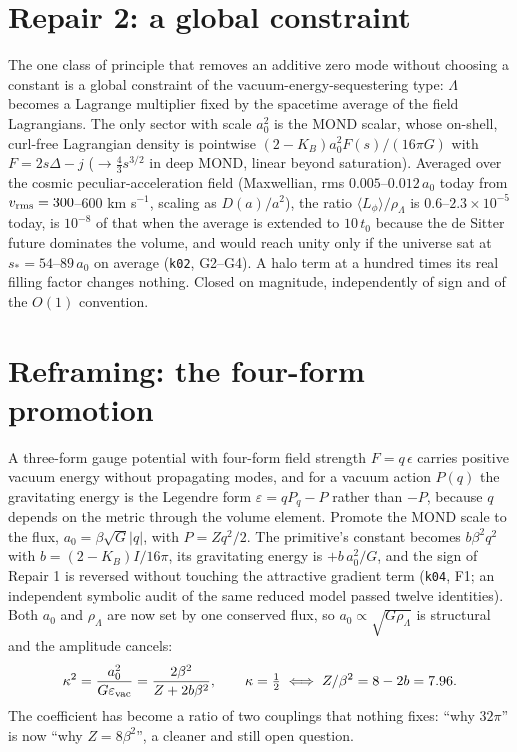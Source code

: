 \documentclass[11pt,letterpaper]{article}
\begin{document}
\section{Repair 2: a global constraint}
The one class of principle that removes an additive zero mode without choosing a constant is a global constraint of the vacuum-energy-sequestering type: $\Lambda$ becomes a Lagrange multiplier fixed by the spacetime average of the field Lagrangians. The only sector with scale $a_0^2$ is the MOND scalar, whose on-shell, curl-free Lagrangian density is pointwise $(2-K_B)a_0^2F(s)/(16\pi G)$ with $F=2s\Delta-j$ ($\to\tfrac43s^{3/2}$ in deep MOND, linear beyond saturation). Averaged over the cosmic peculiar-acceleration field (Maxwellian, rms $0.005$--$0.012\,a_0$ today from $v_{\rm rms}=300$--$600$ km s$^{-1}$, scaling as $D(a)/a^2$), the ratio $\langle L_\phi\rangle/\rho_\Lambda$ is $0.6$--$2.3\times10^{-5}$ today, is $10^{-8}$ of that when the average is extended to $10\,t_0$ because the de Sitter future dominates the volume, and would reach unity only if the universe sat at $s_*=54$--$89\,a_0$ on average (\texttt{k02}, G2--G4). A halo term at a hundred times its real filling factor changes nothing. Closed on magnitude, independently of sign and of the $O(1)$ convention.

\section{Reframing: the four-form promotion}
A three-form gauge potential with four-form field strength $F=q\,\epsilon$ carries positive vacuum energy without propagating modes, and for a vacuum action $P(q)$ the gravitating energy is the Legendre form $\varepsilon=qP_q-P$ rather than $-P$, because $q$ depends on the metric through the volume element. Promote the MOND scale to the flux, $a_0=\beta\sqrt G|q|$, with $P=Zq^2/2$. The primitive's constant becomes $b\beta^2q^2$ with $b=(2-K_B)I/16\pi$, its gravitating energy is $+b\,a_0^2/G$, and the sign of Repair 1 is reversed without touching the attractive gradient term (\texttt{k04}, F1; an independent symbolic audit of the same reduced model passed twelve identities). Both $a_0$ and $\rho_\Lambda$ are now set by one conserved flux, so $a_0\propto\sqrt{G\rho_\Lambda}$ is structural and the amplitude cancels:
\begin{equation}
\kappa^2=\frac{a_0^2}{G\varepsilon_{\rm vac}}=\frac{2\beta^2}{Z+2b\beta^2},\qquad \kappa=\tfrac12\iff Z/\beta^2=8-2b=7.96 .
\end{equation}
The coefficient has become a ratio of two couplings that nothing fixes: ``why $32\pi$'' is now ``why $Z=8\beta^2$'', a cleaner and still open question.
\end{document}
